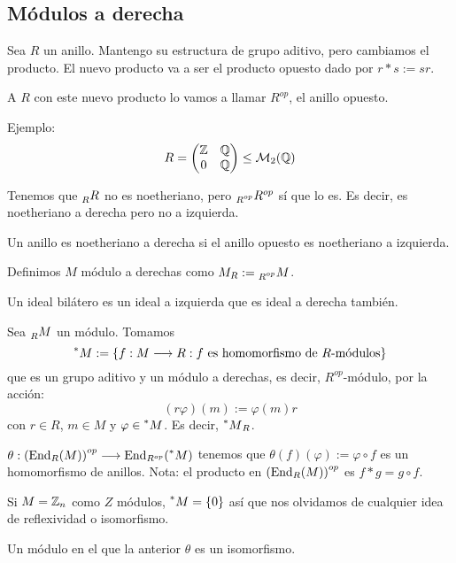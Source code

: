 \subsection{Módulos a derecha}
\begin{df}
Sea \(R\) un anillo. Mantengo su estructura de grupo aditivo, pero cambiamos
el producto. El nuevo producto va a ser el producto opuesto dado por
\(r*s:=sr\).

  A \(R\) con este nuevo producto lo vamos a llamar \(R^{op}\), el anillo
  opuesto.
\end{df}

Ejemplo: \[
  R=
  \begin{pmatrix}
    \mathbb{Z}&\mathbb{Q}\\
    0&\mathbb{Q}
  \end{pmatrix}
  \le \mathcal{M}_2(\mathbb{Q})
\]

Tenemos que \(\prescript{}{R}{R}\) no es noetheriano, pero
\(\prescript{}{R^{op}}{R^{op}}\) sí que lo es.
Es decir, es noetheriano a derecha pero no a izquierda.

\begin{df}
  Un anillo es noetheriano a derecha si el anillo opuesto es noetheriano
  a izquierda.
\end{df}
\begin{df}
  Definimos \(M\) módulo a derechas como \(M_R:=\prescript{}{R^{op}}{M}\).
\end{df}

\begin{df}
  Un ideal bilátero es un ideal a izquierda que es ideal a derecha también.
\end{df}

\begin{df}
  Sea \(\prescript{}{R}{M}\) un módulo. Tomamos
  \[
    \prescript{*}{}{M}:=\{f:M\longrightarrow R: f
    \textrm{ es homomorfismo de \(R\)-módulos}\}
  \]
  que es un grupo aditivo y un módulo a derechas, es decir,
  \(R^{op}\)-módulo, por la acción:
  \[
    (r\varphi)(m):=\varphi(m)r
  \]
  con \(r\in R\), \(m\in M\) y \(\varphi\in \prescript{*}{}{M}\).
  Es decir, \(\prescript{*}{}{M}_R\).
\end{df}

\begin{lema}
  \(\theta:{(\operatorname{End}_R(M))}^{op}
  \longrightarrow\operatorname{End}_{R^{op}}(\prescript{*}{}{M})\)
  tenemos que \(\theta(f)(\varphi):=\varphi\circ f\) es un homomorfismo
  de anillos.
  Nota: el producto en \({(\operatorname{End}_R(M))}^{op}\) es \(f*g=g\circ f\).
\end{lema}

Si \(M=\mathbb{Z}_n\) como \(Z\) módulos, \(\prescript{*}{}{M}=\{0\}\) así que
nos olvidamos de cualquier idea de reflexividad o isomorfismo.

\begin{df}
  Un módulo en el que la anterior \(\theta\) es un isomorfismo.
\end{df}


